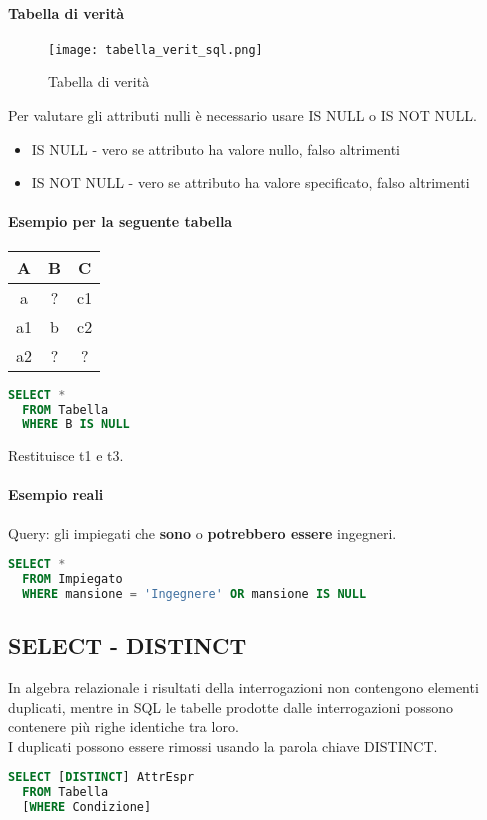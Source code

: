 \paragraph*{Tabella di verità}
\begin{figure}[h]
  \centering
  \texttt{[image: tabella\_verit\_sql.png]}
  \caption{Tabella di verità}
  \label{fig:tabella_verita-SQL}
\end{figure}
Per valutare gli attributi nulli è necessario usare IS NULL o IS NOT NULL.\\
\begin{itemize}
  \item IS NULL - vero se attributo ha valore nullo, falso altrimenti
  \item IS NOT NULL - vero se attributo ha valore specificato, falso altrimenti
\end{itemize}
\paragraph*{Esempio per la seguente tabella}
\begin{tabular}{|c|c|c|}
  \hline
  A & B & C \\
  \hline
  a & ? & c1 \\
  \hline
  a1 & b & c2 \\
  \hline
  a2 & ? & ? \\
  \hline
\end{tabular}
\begin{lstlisting}[language=SQL]
  SELECT *
  FROM Tabella
  WHERE B IS NULL
\end{lstlisting}
Restituisce t1 e t3.
\paragraph*{Esempio reali} Query: gli impiegati che \textbf{sono} o \textbf{potrebbero essere}
ingegneri.
\begin{lstlisting}[language=SQL]
  SELECT *
  FROM Impiegato
  WHERE mansione = 'Ingegnere' OR mansione IS NULL
\end{lstlisting}
\subsection{SELECT - DISTINCT}
In algebra relazionale i risultati della interrogazioni non contengono
elementi duplicati, mentre in SQL le tabelle prodotte dalle interrogazioni
possono contenere più righe identiche tra loro.\\
I duplicati possono essere rimossi usando la parola chiave DISTINCT.
\begin{lstlisting}[language=SQL]
  SELECT [DISTINCT] AttrEspr
  FROM Tabella
  [WHERE Condizione]
\end{lstlisting}
